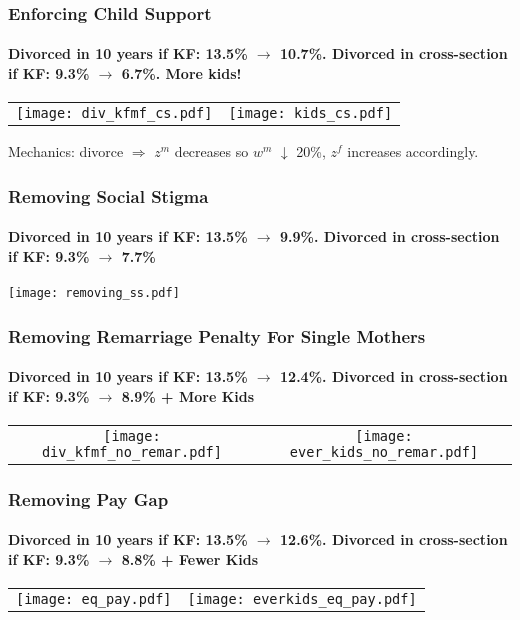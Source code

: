 \documentclass[aspectratio=169]{beamer}
\newcommand{\backupbegin}{
   \newcounter{framenumberappendix}
   \setcounter{framenumberappendix}{\value{framenumber}}
}
\begin{document}
\backupbegin


\begin{frame}[label=child_support]
\frametitle{Enforcing Child Support}
\framesubtitle{Divorced in 10 years if KF: 13.5\% $\to$ 10.7\%. Divorced in cross-section if KF: 9.3\% $\to$ 6.7\%. More kids!}
\begin{center}
\begin{tabular}{c c}
\texttt{[image: div\_kfmf\_cs.pdf]} & \texttt{[image: kids\_cs.pdf]} 
\end{tabular}
\end{center}
Mechanics: divorce $\Rightarrow$ $z^m$ decreases so $w^m$ $\downarrow$ 20\%, $z^f$ increases accordingly.

\hyperlink{cf}{} 
\end{frame}


\begin{frame}[label=noss]
\frametitle{Removing Social Stigma}
\framesubtitle{Divorced in 10 years if KF: 13.5\% $\to$ 9.9\%. Divorced in cross-section if KF: 9.3\% $\to$ 7.7\%}
\begin{center}
\texttt{[image: removing\_ss.pdf]} 
\end{center}
\hyperlink{cf}{} 
\end{frame}

\begin{frame}[label=remarriage_penalty]
\frametitle{Removing Remarriage Penalty For Single Mothers}
\framesubtitle{Divorced in 10 years if KF: 13.5\% $\to$ 12.4\%. Divorced in cross-section if KF: 9.3\% $\to$ 8.9\% + More Kids}
\begin{center}
\begin{tabular}{c c}
\hspace{-1cm} \texttt{[image: div\_kfmf\_no\_remar.pdf]}  &  \texttt{[image: ever\_kids\_no\_remar.pdf]} 
\end{tabular}
\end{center}
\hyperlink{cf}{} 
\end{frame}


\begin{frame}[label=pay_gap]
\frametitle{Removing Pay Gap}
\framesubtitle{Divorced in 10 years if KF: 13.5\% $\to$ 12.6\%. Divorced in cross-section if KF: 9.3\% $\to$ 8.8\% + Fewer Kids}
\begin{center}
\begin{tabular}{c c}
\hspace{-1cm} \texttt{[image: eq\_pay.pdf]}  &  \texttt{[image: everkids\_eq\_pay.pdf]} 
\end{tabular}
\end{center}
\hyperlink{cf}{} 
\end{frame}
\end{document}
